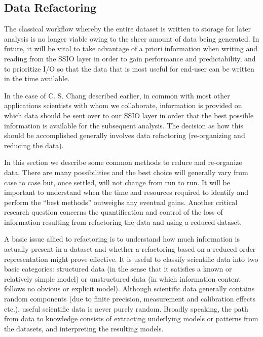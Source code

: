 \subsection{Data Refactoring} \label{sec:data-refactor} 

The classical workflow whereby the entire dataset is written to storage for
later analysis is no longer viable owing to the sheer amount of data being
generated. In future, it will be vital to take advantage of a priori
information when writing and reading from the SSIO layer in order to gain
performance and predictability, and to prioritize I/O so that the data that
is most useful for end-user can be written in the time available. 

In the case of C. S. Chang described earlier, in common with most other
applications scientists with whom we collaborate, information is provided on
which data should be sent over to our SSIO layer in order that the best
possible information is available for the subsequent analysis. The decision as how
this should be accomplished generally involves data refactoring (re-organizing and
reducing the data). 

In this section we describe some common methods to reduce and re-organize data.
There are many possibilities and the best choice will generally vary from case
to case but, once settled, will not change from run to run. It will be
important to understand when the time and resources required to identify and
perform the ``best methods'' outweighs any eventual gains. Another critical
research question concerns the quantification and control of the loss of
information resulting from refactoring the data and using a reduced 
dataset. 

A basic issue allied to refactoring is to understand how much information is
actually present in a dataset and whether a refactoring based on a reduced
order representation might prove effective. It is useful to classify scientific
data into two basic categories: structured data (in the sense that it satisfies
a known or relatively simple model) or unstructured data (in which information
content follows no obvious or explicit model).  Although scientific data
generally contains random components (due to finite precision, measurement and
calibration effects etc.), useful scientific data is never purely random.
Broadly speaking, the path from data to knowledge consists of extracting
underlying models or patterns from the datasets, and interpreting the resulting
models. 

